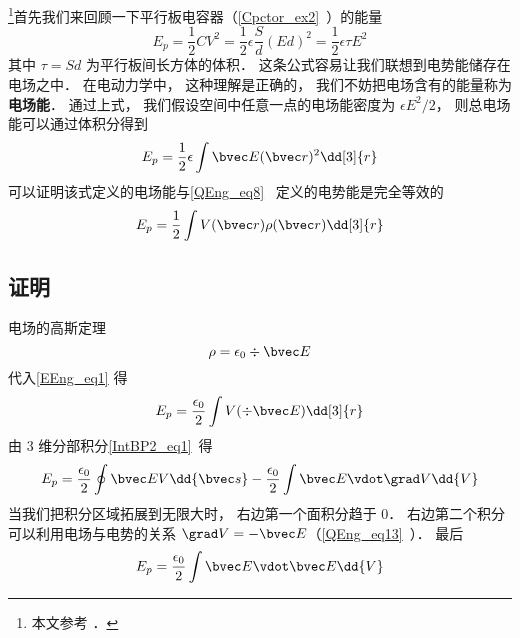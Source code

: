
\begin{issues}
\issueDraft
\end{issues}


\footnote{本文参考 \cite{GriffE}．}首先我们来回顾一下平行板电容器（\autoref{Cpctor_ex2}~）的能量
\begin{equation}
E_p = \frac12 CV^2 = \frac12 \epsilon \frac Sd (Ed)^2 = \frac 12 \epsilon \tau E^2
\end{equation}
其中 $\tau = Sd$ 为平行板间长方体的体积． 这条公式容易让我们联想到电势能储存在电场之中． 在电动力学中， 这种理解是正确的， 我们不妨把电场含有的能量称为\textbf{电场能}． 通过上式， 我们假设空间中任意一点的电场能密度为 $\epsilon E^2/2$， 则总电场能可以通过体积分得到
\begin{equation}
E_p = \frac12 \epsilon \int \bvec E(\bvec r)^2 \dd[3]{r}
\end{equation}
可以证明该式定义的电场能与\autoref{QEng_eq8}~ 定义的电势能是完全等效的
\begin{equation}\label{EEng_eq1}
E_p = \frac 12 \int V(\bvec r) \rho(\bvec r) \dd[3]{r}
\end{equation}

\subsection{证明}


电场的高斯定理
\begin{equation}
\rho = \epsilon_0\div \bvec E
\end{equation}
代入\autoref{EEng_eq1} 得
\begin{equation}
E_p = \frac{\epsilon_0}2 \int V (\div \bvec E) \dd[3]{r}
\end{equation}
由 3 维分部积分\autoref{IntBP2_eq1}~得
\begin{equation}
E_p = \frac{\epsilon_0}2 \oint \bvec E V \dd{\bvec s} - \frac{\epsilon_0}{2} \int \bvec E \vdot \grad V \dd{V}
\end{equation}
当我们把积分区域拓展到无限大时， 右边第一个面积分趋于 0． 右边第二个积分可以利用电场与电势的关系 $\grad V = -\bvec E$（\autoref{QEng_eq13}~）． 最后
\begin{equation}
E_p = \frac{\epsilon_0}{2} \int \bvec E \vdot \bvec E \dd{V}
\end{equation}
